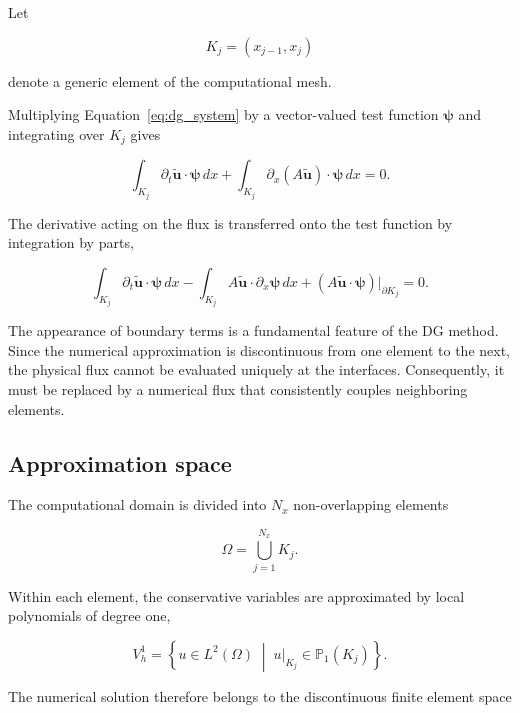 \documentclass[11pt,a4paper]{report}
\theoremstyle{plain}
\theoremstyle{definition}
\begin{document}
Let

\[
K_j=(x_{j-1},x_j)
\]

denote a generic element of the computational mesh.

Multiplying Equation~\eqref{eq:dg_system} by a vector-valued test function
$\boldsymbol\psi$ and integrating over $K_j$ gives

\begin{equation}
\int_{K_j}
\partial_t\tilde{\mathbf u}
\cdot
\boldsymbol\psi
\,dx
+
\int_{K_j}
\partial_x
(A\tilde{\mathbf u})
\cdot
\boldsymbol\psi
\,dx
=
0.
\end{equation}

The derivative acting on the flux is transferred onto the test function by
integration by parts,

\begin{equation}
\int_{K_j}
\partial_t\tilde{\mathbf u}
\cdot
\boldsymbol\psi
\,dx
-
\int_{K_j}
A\tilde{\mathbf u}
\cdot
\partial_x\boldsymbol\psi
\,dx
+
\left(
A\tilde{\mathbf u}
\cdot
\boldsymbol\psi
\right)
\Big|_{\partial K_j}
=
0.
\label{eq:weak_form}
\end{equation}

The appearance of boundary terms is a fundamental feature of the DG method.
Since the numerical approximation is discontinuous from one element to the
next, the physical flux cannot be evaluated uniquely at the interfaces.
Consequently, it must be replaced by a numerical flux that consistently couples
neighboring elements.


\subsection{Approximation space}

The computational domain is divided into $N_x$ non-overlapping elements

\[
\Omega
=
\bigcup_{j=1}^{N_x}
K_j.
\]

Within each element, the conservative variables are approximated by local
polynomials of degree one,

\begin{equation}
V_h^1
=
\left\{
u\in L^2(\Omega)
\;\middle|\;
u|_{K_j}\in\mathbb P_1(K_j)
\right\}.
\end{equation}

The numerical solution therefore belongs to the discontinuous finite element
space
\end{document}

